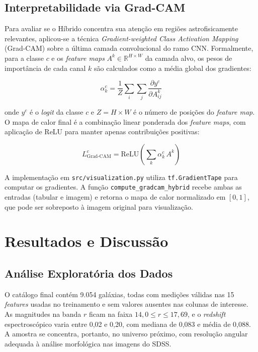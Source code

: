 \documentclass[12pt, a4paper]{article}
\begin{document}
\subsection{Interpretabilidade via Grad-CAM}

Para avaliar se o Híbrido concentra sua atenção em regiões
astrofisicamente relevantes, aplicou-se a técnica \textit{Gradient-weighted
Class Activation Mapping} (Grad-CAM) \cite{selvaraju2017} sobre a última
camada convolucional do ramo CNN. Formalmente, para a classe $c$ e os
\textit{feature maps} $A^k \in \mathbb{R}^{H \times W}$ da camada alvo, os
pesos de importância de cada canal $k$ são calculados como a média global
dos gradientes:

\begin{equation}
  \alpha_k^c = \frac{1}{Z} \sum_i \sum_j \frac{\partial y^c}{\partial A_{ij}^k}
\end{equation}

onde $y^c$ é o \textit{logit} da classe $c$ e $Z = H \times W$ é o número
de posições do \textit{feature map}. O mapa de calor final é a combinação
linear ponderada dos \textit{feature maps}, com aplicação de ReLU para
manter apenas contribuições positivas:

\begin{equation}
  L_\text{Grad-CAM}^c = \text{ReLU}\!\left(\sum_k \alpha_k^c \, A^k\right)
\end{equation}

A implementação em \texttt{src/visualization.py} utiliza
\texttt{tf.GradientTape} para computar os gradientes. A função
\texttt{compute\_gradcam\_hybrid} recebe ambas as entradas (tabular e
imagem) e retorna o mapa de calor normalizado em $[0,1]$, que pode ser
sobreposto à imagem original para visualização.

\section{Resultados e Discussão}

\subsection{Análise Exploratória dos Dados}

O catálogo final contém 9.054 galáxias, todas com medições válidas nas
15 \textit{features} usadas no treinamento e sem valores ausentes nas
colunas de interesse. As magnitudes na banda $r$ ficam na faixa
$14{,}0 \leq r \leq 17{,}69$, e o \textit{redshift} espectroscópico
varia entre 0,02 e 0,20, com mediana de 0,083 e média de 0,088. A
amostra se concentra, portanto, no universo próximo, com resolução
angular adequada à análise morfológica nas imagens do SDSS.
\end{document}
